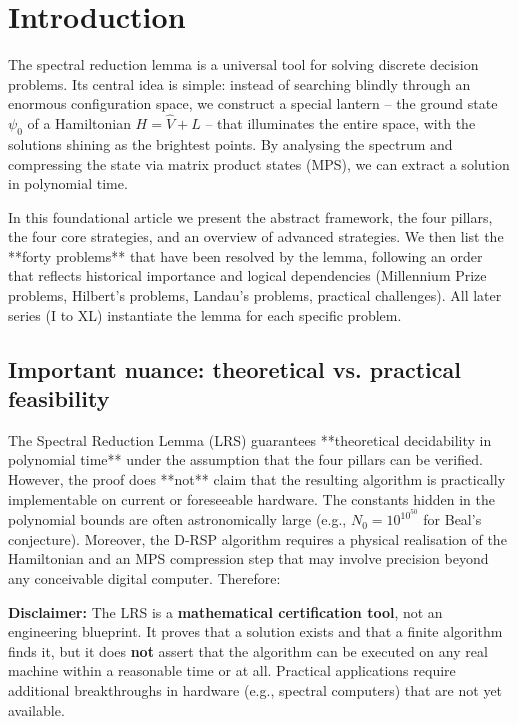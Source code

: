 \documentclass[11pt,a4paper]{article}
\begin{document}
\tableofcontents

\section{Introduction}

The spectral reduction lemma is a universal tool for solving discrete decision problems. Its central idea is simple: instead of searching blindly through an enormous configuration space, we construct a special lantern – the ground state \(\psi_0\) of a Hamiltonian \(H = \hat{V} + L\) – that illuminates the entire space, with the solutions shining as the brightest points. By analysing the spectrum and compressing the state via matrix product states (MPS), we can extract a solution in polynomial time.

In this foundational article we present the abstract framework, the four pillars, the four core strategies, and an overview of advanced strategies. We then list the **forty problems** that have been resolved by the lemma, following an order that reflects historical importance and logical dependencies (Millennium Prize problems, Hilbert's problems, Landau's problems, practical challenges). All later series (I to XL) instantiate the lemma for each specific problem.

\subsection{Important nuance: theoretical vs. practical feasibility}

The Spectral Reduction Lemma (LRS) guarantees **theoretical decidability in polynomial time** under the assumption that the four pillars can be verified. However, the proof does **not** claim that the resulting algorithm is practically implementable on current or foreseeable hardware. The constants hidden in the polynomial bounds are often astronomically large (e.g., \(N_0 = 10^{10^{50}}\) for Beal’s conjecture). Moreover, the D‑RSP algorithm requires a physical realisation of the Hamiltonian and an MPS compression step that may involve precision beyond any conceivable digital computer. Therefore:

\begin{mdframed}[backgroundcolor=gray!10, linecolor=black]
\noindent\textbf{Disclaimer:} The LRS is a \textbf{mathematical certification tool}, not an engineering blueprint. It proves that a solution exists and that a finite algorithm finds it, but it does \textbf{not} assert that the algorithm can be executed on any real machine within a reasonable time or at all. Practical applications require additional breakthroughs in hardware (e.g., spectral computers) that are not yet available.
\end{mdframed}
\end{document}
